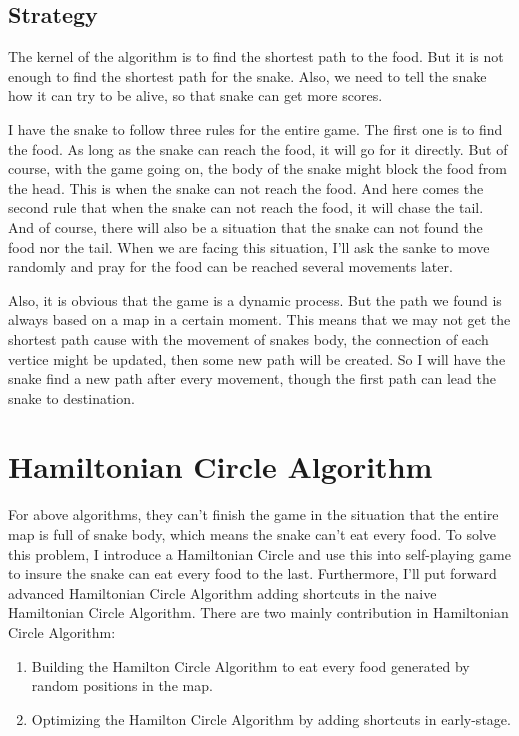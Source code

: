 \documentclass[12pt]{article}
\begin{document}
\subsection{Strategy}

The kernel of the algorithm is to find the shortest path to the food. But it is not enough to
find the shortest path for the snake. Also, we need to tell the snake how it can try to be 
alive, so that snake can get more scores. 

I have the snake to follow three rules for the entire game. The first one is to find the food. 
As long as the snake can reach the food, it will go for it directly. But of course, with the 
game going on, the body of the snake might block the food from the head. This is when the snake
can not reach the food. And here comes the second rule that when the snake can not reach the 
food, it will chase the tail. And of course, there will also be a situation that the snake can
not found the food nor the tail. When we are facing this situation, I'll ask the sanke to move 
randomly and pray for the food can be reached several movements later.

Also, it is obvious that the game is a dynamic process. But the path we found is always based on a map in a certain moment. This means that we may not get the shortest path cause with the movement of snakes body, the connection of each vertice might be updated, then some new path will be created. So I will have the snake find a new path after every movement, though the first path can lead the snake to destination.

\section{Hamiltonian Circle Algorithm}

For above algorithms, they can't finish the game in the situation that the entire map is full of snake body, which means the snake can't eat every food. To solve this problem, I introduce a Hamiltonian Circle and use this into self-playing game to insure the snake can eat every food to the last. Furthermore, I'll put forward advanced Hamiltonian Circle Algorithm adding shortcuts in the naive Hamiltonian Circle Algorithm. There are two mainly contribution in Hamiltonian Circle Algorithm:
\begin{enumerate}
    \item Building the Hamilton Circle Algorithm to eat every food generated by random positions in the map. 
    \item Optimizing the Hamilton Circle Algorithm by adding shortcuts in early-stage.
\end{enumerate}
    
\end{document}
